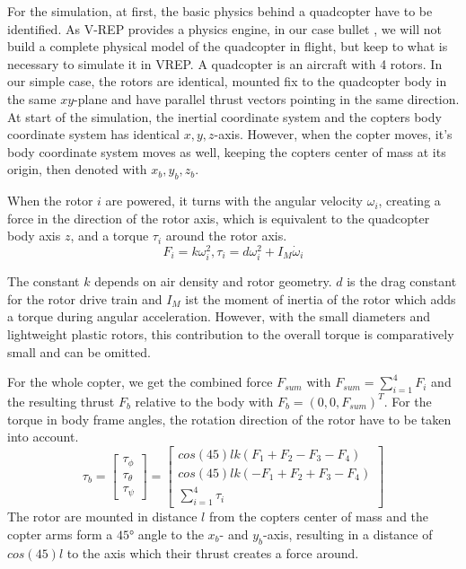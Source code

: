 For the simulation, at first, the basic physics behind a quadcopter have to be identified. As V-REP provides a physics engine, in our case bullet \cite{bullet}, we will not build a complete physical model of the quadcopter in flight, but keep to what is necessary to simulate it in VREP.
A quadcopter is an aircraft with 4 rotors. In our simple case, the rotors are identical, mounted fix to the quadcopter body in the same $xy$-plane and have parallel thrust vectors pointing in the same direction. At start of the simulation, the inertial coordinate system and the copters body coordinate system has identical $x,y,z$-axis. However, when the copter moves, it's body coordinate system moves as well, keeping the copters center of mass at its origin, then denoted with $x_b, y_b, z_b$.

When the rotor $i$ are powered, it turns with the angular velocity $\omega_i$, creating a force in the direction of the rotor axis, which is equivalent to the quadcopter body axis $z$, and a torque $\tau_i$ around the rotor axis.
\begin{equation}
F_i = k\omega_i^2, \tau_i = d\omega_i^2 + I_M\dot\omega_i
\label{equ:forceAndTorque}
\end{equation}

The constant $k$ depends on air density and rotor geometry. $d$ is the drag constant for the rotor drive train and $I_M$ ist the moment of inertia of the rotor which adds a torque during angular acceleration. However, with the small diameters and lightweight plastic rotors, this contribution to the overall torque is comparatively small and can be omitted.

For the whole copter, we get the combined force $F_{sum}$ with $F_{sum} = \sum_{i=1}^{4}{F_i}$ and the resulting thrust $F_b$ relative to the body with $F_b = (0, 0, F_{sum})^T$. For the torque in body frame angles, the rotation direction of the rotor have to be taken into account.
\begin{equation}
\tau_b =\begin{bmatrix}\tau_\phi \\ \tau_\theta \\ \tau_\psi \end{bmatrix} = \begin{bmatrix}cos(45)lk(F_1 + F_2 - F_3 - F_4) \\ cos(45)lk(-F_1 + F_2 + F_3  - F_4  ) \\ \sum_{i=1}^{4}{\tau_i} \end{bmatrix}
\end{equation}
The rotor are mounted in distance $l$ from the copters center of mass and the copter arms form a $\ang{45}$ angle to the $x_b$- and $y_b$-axis, resulting in a distance of $cos(45)l$ to the axis which their thrust creates a force around. 

